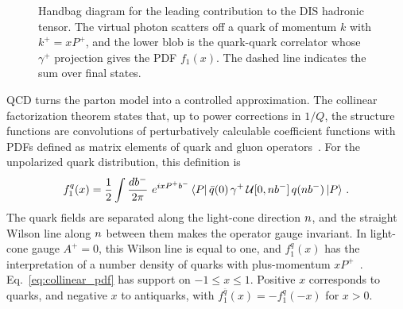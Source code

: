 \begin{figure}[htpb]
\centering
{}
\caption{Handbag diagram for the leading contribution to the DIS hadronic tensor. The virtual photon scatters off a quark of momentum $k$ with $k^+ = xP^+$, and the lower blob is the quark-quark correlator whose $\gamma^+$ projection gives the PDF $f_1(x)$. The dashed line indicates the sum over final states.}
\label{fig:handbag}
\end{figure}

QCD turns the parton model into a controlled approximation. The collinear factorization theorem states that, up to power corrections in $1/Q$, the structure functions are convolutions of perturbatively calculable coefficient functions with PDFs defined as matrix elements of quark and gluon operators~\cite{Collins:1981uw,CollinsBook2011}. For the unpolarized quark distribution, this definition is
\begin{equation}
  f_1^q(x) = \frac{1}{2}\int\frac{db^-}{2\pi}\ e^{ixP^+ b^-}\,
  \langle P|\,\bar{q}(0)\,\gamma^+\,\Wline{0,\nminus b^-}\,q(\nminus b^-)\,|P\rangle \ .
  \label{eq:collinear_pdf}
\end{equation}
The quark fields are separated along the light-cone direction $n$, and the straight Wilson line along $n$ between them makes the operator gauge invariant. In light-cone gauge $A^+ = 0$, this Wilson line is equal to one, and $f_1^q(x)$ has the interpretation of a number density of quarks with plus-momentum $xP^+$~\cite{CollinsBook2011,Brodsky:1997de}. Eq.~\eqref{eq:collinear_pdf} has support on $-1\le x\le 1$. Positive $x$ corresponds to quarks, and negative $x$ to antiquarks, with $f_1^{\bar q}(x) = -f_1^q(-x)$ for $x>0$.


